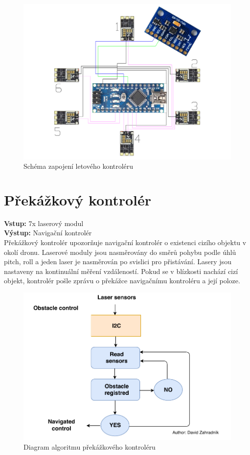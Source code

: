 \begin{figure}[H]
	\centering
	\includegraphics[width=12cm]{pictures/flyctrl.pdf}
	\caption{Schéma zapojení letového kontroléru}
\end{figure}

\section{Překážkový kontrolér} 
\textbf{Vstup:} 7x laserový modul\\
\textbf{Výstup:} Navigační kontrolér\\
Překážkový kontrolér upozorňuje navigační kontrolér o existenci cizího objektu v okolí dronu. Laserové moduly jsou nasměrovány do směrů pohybu podle úhlů pitch, roll a jeden laser je nasměrován po svislici pro přistávání. Lasery jsou nastaveny na kontinuální měření vzdáleností. Pokud se v blízkosti nachází cizí objekt, kontrolér pošle zprávu o překážce navigačnímu kontroléru a její poloze.\\

\begin{figure}[H]
	\centering
	\includegraphics[width=12cm]{pictures/ObstacleDiagram.pdf}
	\caption{Diagram algoritmu překážkového kontroléru}
\end{figure}

